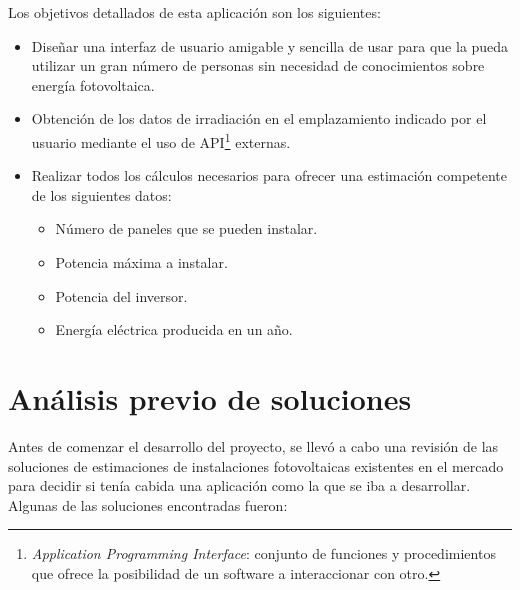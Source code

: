 Los objetivos detallados de esta aplicación son los siguientes:
\begin{itemize}
\item Diseñar una interfaz de usuario amigable y sencilla de usar para que la pueda utilizar un gran número de personas sin necesidad de conocimientos sobre energía fotovoltaica.

\item Obtención de los datos de irradiación en el emplazamiento indicado por el usuario mediante el uso de API\footnote{\textit{Application Programming Interface}: conjunto de funciones y procedimientos que ofrece la posibilidad de un software a interaccionar con otro.} externas.
\item Realizar todos los cálculos necesarios para ofrecer una estimación competente de los siguientes datos:

\begin{itemize}

\item Número de paneles que se pueden instalar.
\item Potencia máxima a instalar.
\item Potencia del inversor.
\item Energía eléctrica producida en un año.

\end{itemize}
\end{itemize}

\section{Análisis previo de soluciones}\label{intro_solutions}

Antes de comenzar el desarrollo del proyecto, se llevó a cabo una revisión de las soluciones de estimaciones de instalaciones fotovoltaicas existentes en el mercado para decidir si tenía cabida una aplicación como la que se iba a desarrollar.\\

Algunas de las soluciones encontradas fueron:

